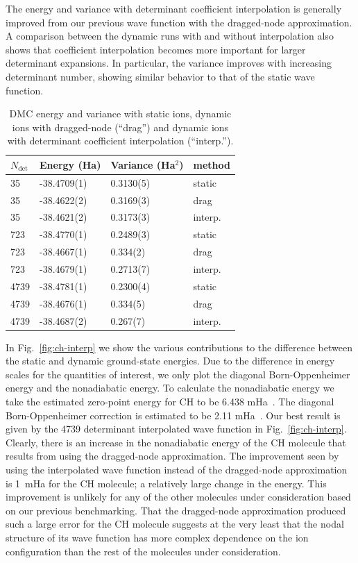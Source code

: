 \documentclass[aip,jcp,numerical,reprint]{revtex4-1}
\begin{document}
The energy and variance with determinant coefficient interpolation is generally improved from our previous wave function with the dragged-node approximation.  A comparison between the dynamic runs with and without interpolation also shows that coefficient interpolation becomes more important for larger determinant expansions.  In particular, the variance improves with increasing determinant number, showing similar behavior to that of the static wave function.   

\begin{table}[h]
\begin{tabular}{llll}
\hline\hline
$N_{\text{det}}$ & Energy (Ha) & Variance (Ha$^2$) & method \\
\hline
35   & -38.4709(1) &  0.3130(5) &    static \\
35   & -38.4622(2) &  0.3169(3) &   drag \\
35   & -38.4621(2) &  0.3173(3) &  interp. \\
723  & -38.4770(1)&  0.2489(3) &    static \\
723  & -38.4667(1) &  0.334(2)~  &   drag \\
723  & -38.4679(1) &  0.2713(7) &  interp. \\
4739 & -38.4781(1) &  0.2300(4) &    static \\
4739 & -38.4676(1) &  0.334(5)~  &   drag \\
4739 & -38.4687(2) &  0.267(7)~  &  interp. \\
\hline\hline
\end{tabular}
\caption{DMC energy and variance with static ions, dynamic ions with dragged-node (``drag'') and dynamic ions with determinant coefficient interpolation (``interp.'').\label{tab:energy}}
\end{table}

In Fig.~\ref{fig:ch-interp} we show the various contributions to the difference between the static and dynamic ground-state energies. Due to the difference in energy scales for the quantities of interest, we only plot the diagonal Born-Oppenheimer energy and the nonadiabatic energy.   To calculate the nonadiabatic energy we take the estimated zero-point energy for CH to be  6.438 mHa~\cite{Feller_Corrections}. The diagonal Born-Oppenheimer correction is estimated to be 2.11 mHa~\cite{Yang2015}. Our best result is given by the 4739 determinant interpolated wave function in Fig.~\ref{fig:ch-interp}.  Clearly, there is an increase in the nonadiabatic energy of the CH molecule that results from using the dragged-node approximation. %
 The improvement seen by using the interpolated wave function instead of the  dragged-node approximation is 1~mHa for the CH molecule; a relatively large change in the energy.  This improvement is unlikely for any of the other molecules under consideration based on our previous benchmarking.    That the dragged-node approximation produced such a large error for the CH molecule  suggests at the very least that the nodal structure of its wave function has more complex dependence on the ion configuration than the rest of the molecules under consideration.  
\end{document}
